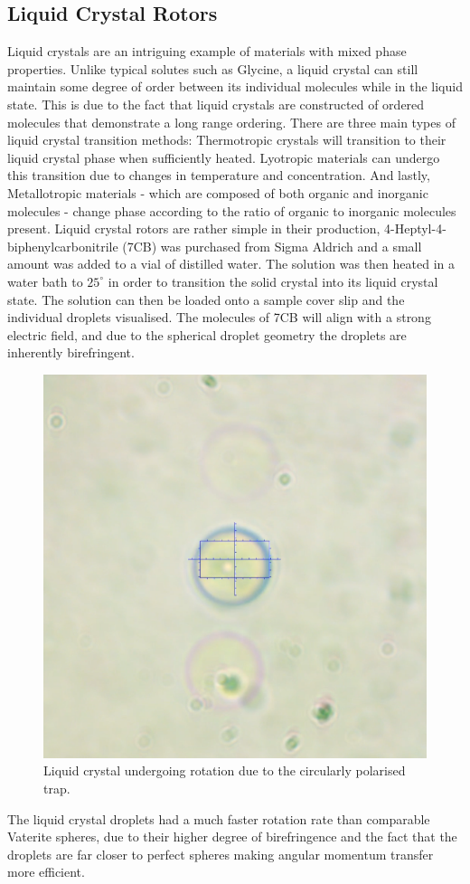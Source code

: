 \subsection{Liquid Crystal Rotors}
Liquid crystals are an intriguing example of materials with mixed phase
properties. Unlike typical solutes such as Glycine, a liquid crystal
can still maintain some degree of order between its individual molecules
while in the liquid state. This is due to the fact that liquid crystals
are constructed of ordered molecules that demonstrate a long range
ordering. There are three main types of liquid crystal transition methods:
Thermotropic crystals will transition to their liquid crystal phase when 
sufficiently heated. Lyotropic materials can undergo this transition due 
to changes in temperature and concentration. And lastly, Metallotropic 
materials - which are composed of both organic and inorganic molecules - 
change phase according to the ratio of organic to inorganic molecules present.
Liquid crystal rotors are rather simple in their production, 4-Heptyl-4-biphenylcarbonitrile (7CB) was purchased from Sigma Aldrich
and a small amount was added to a vial of distilled water. The solution 
was then heated in a water bath to $25^\circ$ in order to transition the
solid crystal into its liquid crystal state. The solution can then be 
loaded onto a sample cover slip and the individual droplets visualised.
The molecules of 7CB will align with a strong electric field, and due to
the spherical droplet geometry the droplets are inherently birefringent. 
\begin{figure}[h!]
	\centering
	\includegraphics[width=0.5\linewidth]{LC_sample.png}
	\caption{Liquid crystal undergoing rotation due to the circularly polarised trap.} 
\end{figure}

The liquid crystal droplets had a much faster rotation rate than comparable 
Vaterite spheres, due to their higher degree of birefringence and the fact
that the droplets are far closer to perfect spheres making angular momentum
transfer more efficient. 

